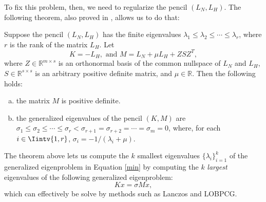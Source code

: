 To fix this problem, then, we need to regularize the pencil $(L_N, L_H)$.
The following theorem, also proved in \cite{fastge2}, allows us to do that:
\begin{theorem}
   Suppose the pencil $(L_N, L_H)$ has the finite eigenvalues $\lambda_1 \le \lambda_2 \le \cdots \le \lambda_r$, where $r$ is the rank of the matrix $L_H$. Let
   \begin{equation}\label{regularization}
      K = - L_H,  \text{ and } M = L_N + \mu L_H + ZSZ^T,
   \end{equation}
   where $Z \in \mathbb R^{m \times s}$ is an orthonormal basis of the common nullspace of $L_N$ and $L_H$, $S \in \mathbb R ^{s \times s}$ is an arbitrary positive definite matrix, and $\mu \in \mathbb R$.
   Then the following holds:
   \begin{enumerate}[(a)]
      \item the matrix $M$ is positive definite.
      \item the generalized eigenvalues of the pencil $(K, M)$ are $\sigma _1 \le \sigma_2 \le \cdots \le \sigma_r < \sigma_{r+1} = \sigma_{r+2} = \cdots = \sigma_m = 0$, where, for each $i \in \Iintv{1,r}$, $\sigma_i = -1/(\lambda_i + \mu)$.
   \end{enumerate}
\end{theorem}

The theorem above lets us compute the $k$ smallest eigenvalues $\{ \lambda_i \}_{i=1}^k$ of the generalized eigenproblem in Equation \vref{min} by computing the $k$ \textit{largest} eigenvalues of the following generalized eigenproblem:
\begin{equation}
K x = \sigma M x,
\end{equation}
which can effectively be solve by methods such as Lanczos and LOBPCG.

